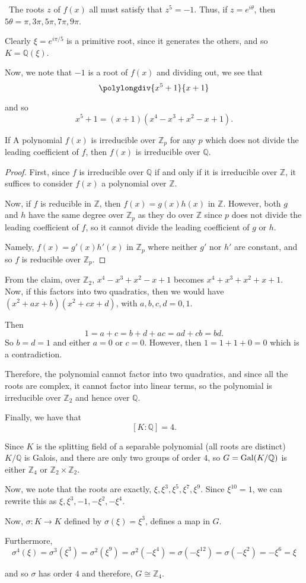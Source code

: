 \documentclass[12pt]{AlgebraQual}
\begin{document}
\begin{solution}$\,$
The roots $z$ of $f(x)$ all must satisfy that $z^5=-1$. Thus, if $z=e^{i\theta}$, then $5\theta=\pi,3\pi,5\pi,7\pi,9\pi$.

Clearly $\xi=e^{i\pi/5}$ is a primitive root, since it generates the others, and so $K=\mathbb{Q}(\xi)$.

Now, we note that $-1$ is a root of $f(x)$ and dividing out, we see that \[
     \polylongdiv{x^5+1}{x+1}
   \]

   and so $$x^5+1=(x+1)(x^4-x^3+x^2-x+1).$$

   \begin{claim} If A polynomial $f(x)$ is irreducible over $\mathbb{Z}_p$ for any $p$ which does not divide the leading coefficient of $f$, then $f(x)$ is irreducible over $\mathbb{Q}$.
   \begin{proof} First, since $f$ is irreducible over $\mathbb{Q}$ if and only if it is irreducible over $\mathbb{Z}$, it suffices to consider $f(x)$ a polynomial over $\mathbb{Z}$.

   Now, if $f$ is reducible in $\mathbb{Z}$, then $f(x)=g(x)h(x)$ in $\mathbb{Z}$. However, both $g$ and $h$ have the same degree over $\mathbb{Z}_p$ as they do over $\mathbb{Z}$ since $p$ does not divide the leading coefficient of $f$, so it cannot divide the leading coefficient of $g$ or $h$.

   Namely, $f(x)=g'(x)h'(x)$ in $\mathbb{Z}_p$ where neither $g'$ nor $h'$ are constant, and so $f$ is reducible over $\mathbb{Z}_p.$
   \end{proof}
   \end{claim}


From the claim, over $\mathbb{Z}_2$, $x^4-x^3+x^2-x+1$ becomes $x^4+x^3+x^2+x+1$. Now, if this factors into two quadratics, then we would have $(x^2+ax+b)(x^2+cx+d)$, with $a,b,c,d=0,1$.

Then $$1=a+c=b+d+ac=ad+cb=bd.$$ So $b=d=1$ and either $a=0$ or $c=0$. However, then $1=1+1+0=0$ which is a contradiction.

Therefore, the polynomial cannot factor into two quadratics, and since all the roots are complex, it cannot factor into linear terms, so the polynomial is irreducible over $\mathbb{Z}_2$ and hence over $\mathbb{Q}$.

Finally, we have that $$[K:\mathbb{Q}]=4.$$

Since $K$ is the splitting field of a separable polynomial (all roots are distinct) $K/\mathbb{Q}$ is Galois, and there are only two groups of order $4$, so $G=\text{Gal}(K/\mathbb{Q})$ is either $\mathbb{Z}_4$ or $\mathbb{Z}_2\times\mathbb{Z}_2$.

Now, we note that the roots are exactly, $\xi,\xi^3,\xi^5,\xi^7,\xi^9.$ Since $\xi^{10}=1$, we can rewrite this as $\xi,\xi^3,-1,-\xi^2,-\xi^4.$

Now, $\sigma:K\to K$ defined by $\sigma(\xi)=\xi^3$, defines a map in $G$.

Furthermore, $$\sigma^4(\xi)=\sigma^3(\xi^3)=\sigma^2(\xi^9)=\sigma^2(-\xi^4)=\sigma(-\xi^{12})=\sigma(-\xi^2)=-\xi^6=\xi$$

and so $\sigma$ has order $4$ and therefore, $G\cong\mathbb{Z}_4.$

\end{solution}
\end{document}
